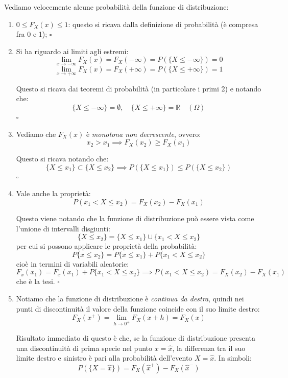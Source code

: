 \documentclass[a4paper,11pt]{article}
\begin{document}
\noindent
Vediamo velocemente alcune probabilità della funzione di distribuzione:
\begin{enumerate}
\item $0 \leq F_X(x) \leq 1$: questo si ricava dalla definizione di probabilità (è compresa fra 0 e 1); \hfill $\square$

\item Si ha riguardo ai limiti agli estremi:
$$
\lim_{x \to -\infty} F_X(x) = F_X(-\infty) = P(\{X \leq -\infty\}) = 0$$
$$
\lim_{x \to +\infty} F_X(x) = F_X(+\infty) = P(\{X \leq +\infty\}) = 1
$$

Questo si ricava dai teoremi di probabilità  (in particolare i primi 2) e notando che:
$$
\{ X \leq - \infty \} = \emptyset, \quad \{ X \leq + \infty \} = \mathbb{R} \quad (\Omega)
$$ \hfill $\square$

\item Vediamo che $F_X(x)$ è \textit{monotona non decrescente}, ovvero:
$$
x_2 > x_1 \implies F_X(x_2) \geq F_X(x_1)
$$

Questo si ricava notando che:
$$
\{X \leq x_1 \} \subset \{ X \leq x_2 \} \implies P(\{X \leq x_1 \}) \leq P(\{X \leq x_2 \})
$$ \hfill $\square$

\item Vale anche la proprietà:
$$
P(x_1 < X \leq x_2) = F_X (x_2) - F_X (x_1)
$$

Questo viene notando che la funzione di distribuzione può essere vista come l'unione di intervalli disgiunti:
$$
\{ X \leq x_2 \} = \{ X \leq x_1 \} \cup \{ x_1 < X \leq x_2 \}
$$
per cui si possono applicare le proprietà della probabilità:
$$
P\{ x \leq x_2 \} = P\{ x \leq x_1 \} + P\{ x_1 < X \leq x_2 \}
$$
cioè in termini di variabili aleatorie:
$$
F_x (x_1) = F_x (x_1) + P\{ x_1 < X \leq x_2 \} \implies P(x_1 < X \leq x_2) = F_X (x_2) - F_X (x_1)
$$
che è la tesi. \hfill $\square$

\item Notiamo che la funzione di distribuzione è \textit{continua da destra}, quindi nei punti di discontinuità il valore della funzione coincide con il suo limite destro:
$$
F_X (x^+) = \lim_{h \rightarrow 0^+} F_X(x + h) = F_X(x)
$$

Risultato immediato di questo è che, se la funzione di distribuzione presenta una discontinuità di prima specie nel punto $x = \hat{x}$, la differenza tra il suo limite destro e sinistro è pari alla probabilità dell’evento $X = \hat{x}$. In simboli:
$$
P(\{ X = \hat{x} \}) = F_X(\hat{x}^+) - F_X(\hat{x}^-)
$$
\end{enumerate}
\end{document}
